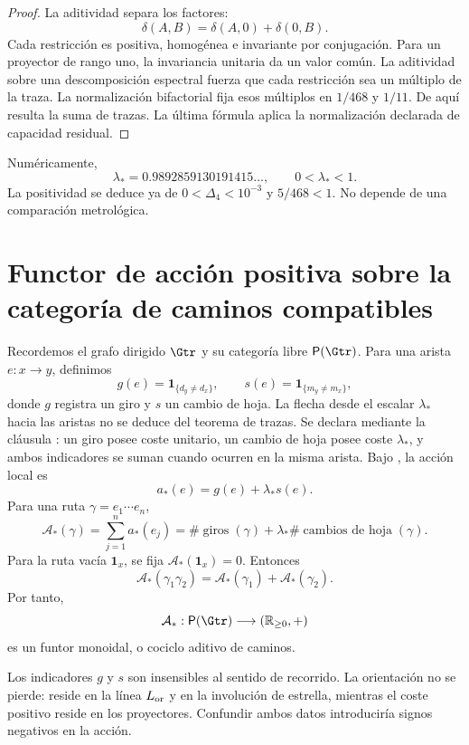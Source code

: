 \begin{proof}
La aditividad separa los factores:
\[
 \delta(A,B)=\delta(A,0)+\delta(0,B).
\]
Cada restricción es positiva, homogénea e invariante por conjugación. Para
un proyector de rango uno, la invariancia unitaria da un valor común. La
aditividad sobre una descomposición espectral fuerza que cada restricción
sea un múltiplo de la traza. La normalización bifactorial fija esos múltiplos en
\(1/468\) y \(1/11\). De aquí resulta la suma de trazas. La última fórmula
aplica la normalización declarada de capacidad residual.
\end{proof}

Numéricamente,
\[
 \boxed{\lambda_*=0.9892859130191415\ldots},
 \qquad
 0<\lambda_*<1.
\]
La positividad se deduce ya de
\(0<\Delta_4<10^{-3}\) y \(5/468<1\). No depende de una comparación
metrológica.

\section{Functor de acción positiva sobre la categoría de caminos compatibles}

Recordemos el grafo dirigido \(\Gtr\) y su categoría libre
\(\mathsf P(\Gtr)\). Para una arista
\(e:x\to y\), definimos
\[
 g(e)=\mathbf1_{\{d_y\ne d_x\}},
 \qquad
 s(e)=\mathbf1_{\{m_y\ne m_x\}},
\]
donde \(g\) registra un giro y \(s\) un cambio de hoja. La flecha desde el
escalar \(\lambda_*\) hacia las aristas no se deduce del
teorema de trazas. Se declara mediante la cláusula \HLoc: un giro posee coste
unitario, un cambio de hoja posee coste \(\lambda_*\), y ambos indicadores se
suman cuando ocurren en la misma arista. Bajo \HLoc, la acción local es
\[
 \boxed{a_*(e)=g(e)+\lambda_*s(e).}
\]
Para una ruta \(\gamma=e_1\cdots e_n\),
\[
 \mathcal A_*(\gamma)
 =\sum_{j=1}^na_*(e_j)
 =\#\operatorname{giros}(\gamma)
 +\lambda_*\#\operatorname{cambios\ de\ hoja}(\gamma).
\]
Para la ruta vacía \(\mathbf1_x\), se fija
\(\mathcal A_*(\mathbf1_x)=0\). Entonces
\[
 \boxed{
 \mathcal A_*(\gamma_1\gamma_2)
 =\mathcal A_*(\gamma_1)+\mathcal A_*(\gamma_2).
 }
\]
Por tanto,
\[
 \mathcal A_*:\mathsf P(\Gtr)\longrightarrow(\mathbb R_{\ge0},+)
\]
es un funtor monoidal, o cociclo aditivo de caminos.

Los indicadores \(g\) y \(s\) son insensibles al sentido de recorrido. La
orientación no se pierde: reside en la línea \(L_{\rm or}\) y en la
involución de estrella, mientras el coste positivo reside en los
proyectores. Confundir ambos datos introduciría signos negativos en la
acción.

